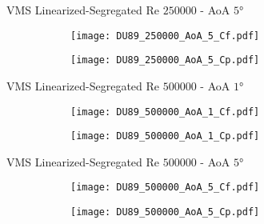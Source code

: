 \begin{frame}{VMS Linearized-Segregated}
Re $\num{250000}$ - AoA $\ang{5}$ 
\begin{figure}[h]
     \centering          
     \begin{subfigure}[h]{0.45\textwidth}
              \centering
         \texttt{[image: DU89\_250000\_AoA\_5\_Cf.pdf]}
    \end{subfigure}
          \hfill
     \begin{subfigure}[h]{0.45\textwidth}
      \centering
         \texttt{[image: DU89\_250000\_AoA\_5\_Cp.pdf]}
     \end{subfigure}
     \end{figure} 
 \end{frame}

\begin{frame}{VMS Linearized-Segregated}
Re $\num{500000}$ - AoA $\ang{1}$ 
\begin{figure}[h]
     \centering          
     \begin{subfigure}[h]{0.45\textwidth}
              \centering
         \texttt{[image: DU89\_500000\_AoA\_1\_Cf.pdf]}
    \end{subfigure}
          \hfill
     \begin{subfigure}[h]{0.45\textwidth}
      \centering
         \texttt{[image: DU89\_500000\_AoA\_1\_Cp.pdf]}
     \end{subfigure}
     \end{figure} 
 \end{frame}

\begin{frame}{VMS Linearized-Segregated}
Re $\num{500000}$ - AoA $\ang{5}$ 
\begin{figure}[h]
     \centering          
     \begin{subfigure}[h]{0.45\textwidth}
              \centering
         \texttt{[image: DU89\_500000\_AoA\_5\_Cf.pdf]}
    \end{subfigure}
          \hfill
     \begin{subfigure}[h]{0.45\textwidth}
      \centering
         \texttt{[image: DU89\_500000\_AoA\_5\_Cp.pdf]}
     \end{subfigure}
     \end{figure} 
 \end{frame}

